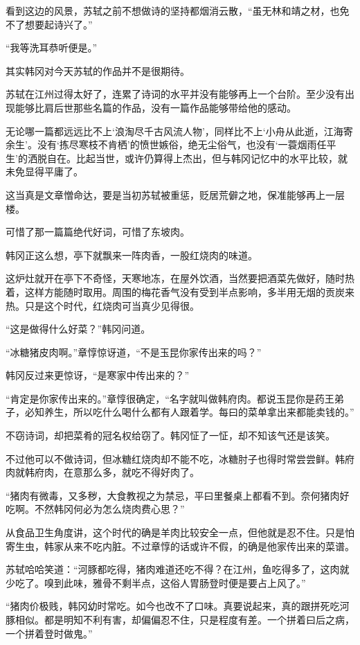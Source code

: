 看到这边的风景，苏轼之前不想做诗的坚持都烟消云散，“虽无林和靖之材，也免不了想要起诗兴了。”

“我等洗耳恭听便是。”

其实韩冈对今天苏轼的作品并不是很期待。

苏轼在江州过得太好了，连累了诗词的水平并没有能够再上一个台阶。至少没有出现能够比肩后世那些名篇的作品，没有一篇作品能够带给他的感动。

无论哪一篇都远远比不上‘浪淘尽千古风流人物’，同样比不上‘小舟从此逝，江海寄余生’。没有‘拣尽寒枝不肯栖’的愤世嫉俗，绝无尘俗气，也没有‘一蓑烟雨任平生’的洒脱自在。比起当世，或许仍算得上杰出，但与韩冈记忆中的水平比较，就未免显得平庸了。

这当真是文章憎命达，要是当初苏轼被重惩，贬居荒僻之地，保准能够再上一层楼。

可惜了那一篇篇绝代好词，可惜了东坡肉。

韩冈正这么想，亭下就飘来一阵肉香，一股红烧肉的味道。

这炉灶就开在亭下不奇怪，天寒地冻，在屋外饮酒，当然要把酒菜先做好，随时热着，这样方能随时取用。周围的梅花香气没有受到半点影响，多半用无烟的贡炭来热。只是这个时代，红烧肉可当真少见得很。

“这是做得什么好菜？”韩冈问道。

“冰糖猪皮肉啊。”章惇惊讶道，“不是玉昆你家传出来的吗？”

韩冈反过来更惊讶，“是寒家中传出来的？”

“肯定是你家传出来的。”章惇很确定，“名字就叫做韩府肉。都说玉昆你是药王弟子，必知养生，所以吃什么喝什么都有人跟着学。每曰的菜单拿出来都能卖钱的。”

不窃诗词，却把菜肴的冠名权给窃了。韩冈怔了一怔，却不知该气还是该笑。

不过他可以不做诗词，但冰糖红烧肉却不能不吃，冰糖肘子也得时常尝尝鲜。韩府肉就韩府肉，在意那么多，就吃不得好肉了。

“猪肉有微毒，又多秽，大食教视之为禁忌，平曰里餐桌上都看不到。奈何猪肉好吃啊。不然韩冈何必为怎么烧肉费心思？”

从食品卫生角度讲，这个时代的确是羊肉比较安全一点，但他就是忍不住。只是怕寄生虫，韩家从来不吃内脏。不过章惇的话或许不假，的确是他家传出来的菜谱。

苏轼哈哈笑道：“河豚都吃得，猪肉难道还吃不得？在江州，鱼吃得多了，这肉就少吃了。嗅到此味，雅骨不剩半点，这俗人胃肠登时便是要占上风了。”

“猪肉价极贱，韩冈幼时常吃。如今也改不了口味。真要说起来，真的跟拼死吃河豚相似。都是明知不利有害，却偏偏忍不住，只是程度有差。一个拼着曰后之病，一个拼着登时做鬼。”

